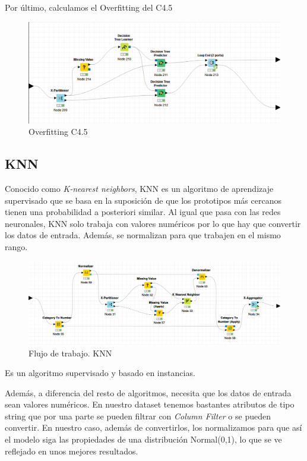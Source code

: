 	Por último, calculamos el Overfitting del C4.5
	\begin{figure}[H]
		\centering
		\includegraphics[width=1\textwidth]{img/c45over.png}
		\caption{Overfitting C4.5}
	\end{figure}
	
	
	
	\subsection{KNN}
	\hspace{1cm} Conocido como \textit{K-nearest neighbors}, KNN es un algoritmo de aprendizaje supervisado que se basa en la suposición de que los prototipos más cercanos tienen una probabilidad a posteriori similar. Al igual que pasa con las redes neuronales, KNN solo trabaja con valores numéricos por lo que hay que convertir los datos de entrada. Además, se normalizan para que trabajen en el mismo rango.
	
	
	\begin{figure}[H]
		    \centering
			\includegraphics[width=1\textwidth]{img/KNN.png}
			\caption{Flujo de trabajo. KNN}
		\end{figure}
	
	Es un algoritmo supervisado y basado en instancias. 
	
	Además, a diferencia del resto de algoritmos, necesita que los datos de entrada sean valores numéricos. En nuestro dataset tenemos bastantes atributos de tipo string que por una parte se pueden filtrar con \textit{Column Filter} o se pueden convertir.
	En nuestro caso, además de convertirlos, los normalizamos para que así el modelo siga las propiedades de una distribución Normal(0,1), lo que se ve reflejado en unos mejores resultados. 
	
